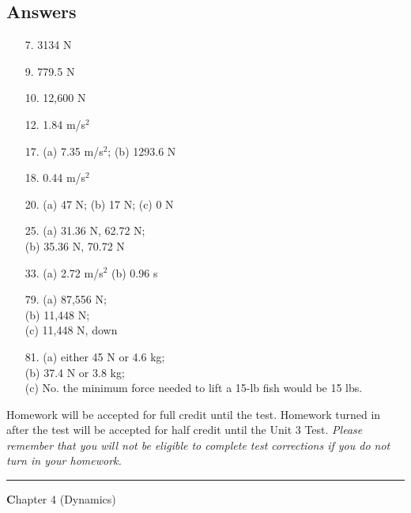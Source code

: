 \documentclass[10pt]{exam}
\def\mytitle{Chapter 4 (Dynamics)}
\def\mymaketitle{
  \begin{flushleft}
    {\LARGE \textbf \mytitle \par}
  \end{flushleft}
}
\begin{document}
  


\subsection*{Answers}

\begin{multicols}{3}

  \begin{itemize}[noitemsep]
    \item[7. ] 3134 N
    \item[9. ] 779.5 N
    \item[10.] 12,600 N
    \item[12.] 1.84 m/s$^2$
    \item[17.] (a) 7.35 m/s$^2$; (b) 1293.6 N
    \item[18.] 0.44 m/s$^2$
    \item[20.] (a) 47 N; (b) 17 N; (c) 0 N
    \item[25.] (a) 31.36 N, 62.72 N; \\
               (b) 35.36 N, 70.72 N
    \item[33.] (a) 2.72 m/s$^2$ (b) 0.96 s
    \item[79.] (a) 87,556 N; \\
               (b) 11,448 N; \\
               (c) 11,448 N, down
    \item[81.] (a) either 45 N or 4.6 kg; \\
               (b) 37.4 N or 3.8 kg; \\
               (c) No. the minimum force needed to lift a 15-lb fish would be 15 lbs.
    
    
  \end{itemize}
  
\end{multicols}

\noindent
{\footnotesize Homework will be accepted for full credit until the test.
Homework turned in after the test will be accepted for half credit
until the Unit 3 Test.
\emph{Please remember that you will not be eligible to complete 
test corrections if you do not turn in your homework.}}

\vspace{1em}
\hrule 



\pagebreak

\mymaketitle
\end{document}
